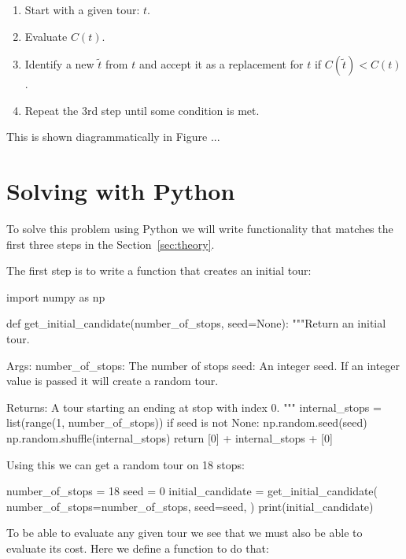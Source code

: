 \begin{enumerate}
    \item Start with a given tour: \(t\).
    \item Evaluate \(C(t)\).
    \item Identify a new \(\tilde t\) from \(t\) and accept it as a replacement
        for \(t\) if \(C(\tilde t)<
        C(t)\).
    \item Repeat the 3rd step until some condition is met.
\end{enumerate}

This is shown diagrammatically in Figure ... %
\section{Solving with Python}\label{sec:solving-with-python}

To solve this problem using Python we will write functionality that matches the
first three steps in the Section~\ref{sec:theory}.

The first step is to write a function that creates an initial tour:

\begin{pyin}
import numpy as np


def get_initial_candidate(number_of_stops, seed=None):
    """Return an initial tour.

    Args:
        number_of_stops: The number of stops
        seed: An integer seed. If an integer value is
              passed it will create a random tour.

    Returns:
        A tour starting an ending at stop with index 0.
    """
    internal_stops = list(range(1, number_of_stops))
    if seed is not None:
        np.random.seed(seed)
        np.random.shuffle(internal_stops)
    return [0] + internal_stops + [0]
\end{pyin}

Using this we can get a random tour on 18 stops:

\begin{pyin}
number_of_stops = 18
seed = 0
initial_candidate = get_initial_candidate(
    number_of_stops=number_of_stops, 
    seed=seed,
)
print(initial_candidate)
\end{pyin}

\begin{pyout}
[0, 2, 7, 9, 10, 14, 5, 3, 15, 11, 8, 17, 12, 4, 1, 6, 16, 13, 0]
\end{pyout}

To be able to evaluate any given tour we see that we must also be able to
evaluate its cost. Here we define a function to do that:

